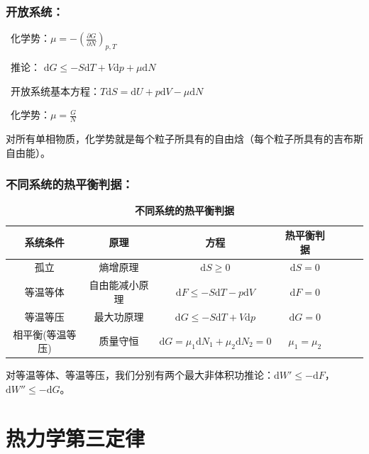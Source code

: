 \documentclass[zihao=-4,UTF8]{report}
\begin{document}
\subsubsection{开放系统：}
\par{}\  化学势：$\mu = -\left(\frac{\partial G}{\partial N}\right)_{p,T}$\par
{}\  推论： $\mathrm{d}G \le -S\mathrm{d}T + V\mathrm{d}p +\mu \mathrm{d}N$  \par
{}\   开放系统基本方程：$T\mathrm{d}S = \mathrm{d}U + p\mathrm{d}V - \mu \mathrm{d}N$  \par
{}\   化学势：$\mu =\frac{G}{N}$  \par
{\par\color{gray}\small
对所有单相物质，化学势就是每个粒子所具有的自由焓（每个粒子所具有的吉布斯自由能）。
\par}

\subsubsection{不同系统的热平衡判据：}

\begin{table}[H]
    \caption{\textbf{不同系统的热平衡判据}}
    \centering
    \begin{tabular}{ccccccc} 
    \toprule
    系统条件& 原理 &方程 & 热平衡判据 \\
    \hline
    孤立 & 熵增原理 &$\mathrm{d}S \ge 0$ & $\mathrm{d}S=0$\\
    等温等体 & 自由能减小原理 & $\mathrm{d}F \le -S\mathrm{d}T - p\mathrm{d}V$  & $\mathrm{d}F = 0$\\
    等温等压 & 最大功原理 & $\mathrm{d}G \le -S\mathrm{d}T + V\mathrm{d}p $& $\mathrm{d}G = 0$ \\
    相平衡(等温等压) & 质量守恒 & $\mathrm{d}G = \mu_1 \mathrm{d}N_1 + \mu_2\mathrm{d}N_2 = 0$& $\mu_1 = \mu_2$ \\
    \bottomrule
    \end{tabular}
\end{table}
{\par\color{gray}\small
对等温等体、等温等压，我们分别有两个最大非体积功推论：$\mathrm{d}W'\le -\mathrm{d}F$，$\mathrm{d}W'' \le -\mathrm{d}G$。

\par}


\section{热力学第三定律}
\end{document}
